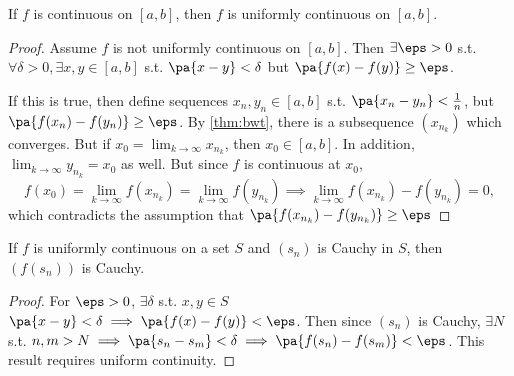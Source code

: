 \documentclass[11pt]{scrartcl}
\numberwithin{equation}{section}
\begin{document}
\begin{theorem}
    If $f$ is continuous on $[a,b]$, then $f$ is uniformly continuous 
    on $[a,b]$.
\end{theorem}

\begin{proof}
    Assume $f$ is not uniformly continuous on $[a,b]$. 
    Then $\exists \eps>0$ s.t. $\forall \delta>0, \exists x,y \in [a,b]$
    s.t. $\pa{x-y} < \delta$ but $\pa{f(x)-f(y)}\geq \eps$.

    If this is true, then define sequences $x_n, y_n\in [a,b]$ s.t.
    $\pa{x_n-y_n}<\frac{1}{n}$, but $\pa{f(x_n)-f(y_n)} \geq \eps$.
    By \cref{thm:bwt}, there is a subsequence $(x_{n_k})$ 
    which converges. But if $x_0=\lim_{k\rightarrow \infty}x_{n_k}$,
    then $x_0\in [a,b]$. In addition, $\lim_{k\rightarrow \infty}y_{n_k}=x_0$ as well. But since $f$ is continuous at $x_0$, 
    \[ f(x_0) = \lim_{k\rightarrow \infty}f(x_{n_k})= \lim_{k\rightarrow \infty}f(y_{n_k}) \implies \lim_{k\rightarrow \infty}f(x_{n_k})-f(y_{n_k}) = 0, \]
    which contradicts the assumption that 
    $\pa{f(x_{n_k})-f(y_{n_k})} \geq \eps$
\end{proof}

\begin{theorem}
    If $f$ is uniformly continuous on a set $S$ and $(s_n)$ is Cauchy 
    in $S$, then $(f(s_n))$ is Cauchy.
\end{theorem}

\begin{proof}
    For $\eps>0$, $\exists \delta$ s.t. $x,y\in S$ $\pa{x-y}<\delta 
    \implies \pa{f(x)-f(y)}<\eps$. Then since $(s_n)$ is Cauchy, 
    $\exists N$ s.t. $n,m > N \implies \pa{s_n-s_m}<\delta\implies \pa{f(s_n)-f(s_m)}<\eps$.
    This result requires uniform continuity.
\end{proof}
\end{document}
